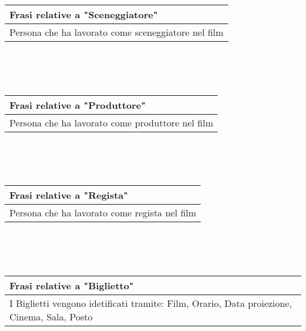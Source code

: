 \documentclass[10pt]{article}
\begin{document}
	\\\\\\
	\begin{tabular} { |p{16.8cm}| }
		\hline
		\rowcolor{lightgray}
		\textbf{Frasi relative a "Sceneggiatore"} \\
		\hline
		Persona che ha lavorato come sceneggiatore nel film \\
		\hline 		
	\end{tabular} 
	\\\\\\
	\begin{tabular} { |p{16.8cm}| }
		\hline
		\rowcolor{lightgray}
		\textbf{Frasi relative a "Produttore"} \\
		\hline
		Persona che ha lavorato come produttore nel film \\
		\hline 		
	\end{tabular} 
	\\\\\\
	\begin{tabular} { |p{16.8cm}| }
		\hline
		\rowcolor{lightgray}
		\textbf{Frasi relative a "Regista"} \\
		\hline
		Persona che ha lavorato come regista nel film \\
		\hline 		
	\end{tabular} 
	\\\\\\
	\begin{tabular} { |p{16.8cm}| }
		\hline
		\rowcolor{lightgray}
		\textbf{Frasi relative a "Biglietto"} \\
		\hline
		I Biglietti vengono idetificati tramite: Film, Orario, Data proiezione, Cinema, Sala, Posto \\
		\hline 		
	\end{tabular} 
	
	
	
\end{document}
